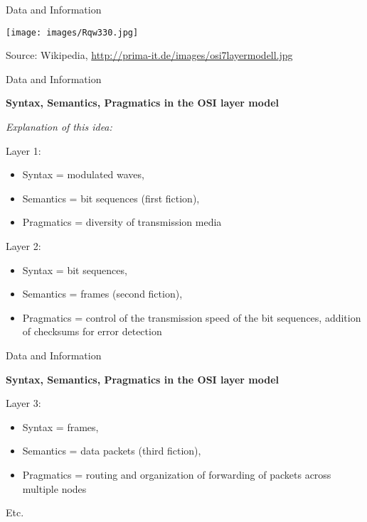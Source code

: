 \documentclass{beamer}
\newcommand{\ueberschrift}[1]{\begin{center}\bf #1\end{center}}
\begin{document}
\begin{frame}{Data and Information}
  \begin{center}
    \texttt{[image: images/Rqw330.jpg]}
  \end{center}
Source: Wikipedia, \url{http://prima-it.de/images/osi7layermodell.jpg}
\end{frame}
\begin{frame}{Data and Information}

  \ueberschrift{Syntax, Semantics, Pragmatics in the OSI layer model}

\emph{Explanation of this idea:}

Layer 1: 
\begin{itemize}
\item Syntax = modulated waves,
\item Semantics = bit sequences (first fiction), 
\item Pragmatics = diversity of transmission media
\end{itemize}
Layer 2: 
\begin{itemize}
\item Syntax = bit sequences, 
\item Semantics = frames (second fiction),
\item Pragmatics = control of the transmission speed of the bit sequences,
  addition of checksums for error detection
\end{itemize}\vspace*{2em}
\end{frame}
\begin{frame}{Data and Information}

  \ueberschrift{Syntax, Semantics, Pragmatics in the OSI layer model}

Layer 3: 
\begin{itemize}
\item Syntax = frames, 
\item Semantics = data packets (third fiction),
\item Pragmatics = routing and organization of forwarding of packets across
  multiple nodes
\end{itemize}
Etc.\vfill
\end{frame}
\end{document}
